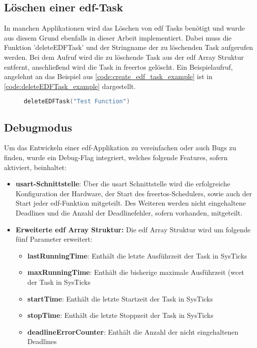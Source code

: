 \documentclass[../EDF Master Thesis.tex]{subfiles}
\begin{document}
\clearpage

\subsection{Löschen einer \acf{edf}-Task} \label{section:löschen_einer_edf_task}

    In manchen Applikationen wird das Löschen von \ac{edf} Tasks benötigt und wurde aus diesem Grund ebenfalls in dieser Arbeit implementiert.
    Dabei muss die Funktion 'deleteEDFTask' und der Stringname der zu löschenden Task aufgerufen werden.
    Bei dem Aufruf wird die zu löschende Task aus der \ac{edf} Array Struktur entfernt, anschließend wird die Task in \ac{freertos} gelöscht.
    Ein Beispielaufruf, angelehnt an das Beispiel aus \autoref{code:create_edf_task_example} ist in \autoref{code:deleteEDFTask_example} dargestellt.

\begin{figure}[ht!]
\begin{lstlisting}[language=C, caption=deleteEDFTask Beispiel, label=code:deleteEDFTask_example]
    deleteEDFTask("Test Function")
\end{lstlisting}
\end{figure}

\subsection{Debugmodus} \label{section:debug_mode}

    Um das Entwickeln einer \ac{edf}-Applikation zu vereinfachen oder auch Bugs zu finden, wurde ein Debug-Flag integriert, welches folgende Features, sofern aktiviert, beinhaltet:

    \begin{itemize}
        \item \textbf{\ac{usart}-Schnittstelle}: Über die \ac{usart} Schnittstelle wird die erfolgreiche Konfiguration der Hardware, der Start des \ac{freertos}-Schedulers, sowie auch der Start jeder \ac{edf}-Funktion mitgeteilt.
                                                 Des Weiteren werden nicht eingehaltene Deadlines und die Anzahl der Deadlinefehler, sofern vorhanden, mitgeteilt.
        \item \textbf{Erweiterte \ac{edf} Array Struktur:} Die \ac{edf} Array Struktur wird um folgende fünf Parameter erweitert:
        \begin{itemize}
            \item \textbf{lastRunningTime}: Enthält die letzte Ausführzeit der Task in SysTicks
            \item \textbf{maxRunningTime}: Enthält die bisherige maximale Ausführzeit (\ac{wcet} der Task in SysTicks
            \item \textbf{startTime}: Enthält die letzte Startzeit der Task in SysTicks
            \item \textbf{stopTime}: Enthält die letzte Stoppzeit der Task in SysTicks
            \item \textbf{deadlineErrorCounter}: Enthält die Anzahl der nicht eingehaltenen Deadlines
        \end{itemize}
    \end{itemize}
\end{document}
